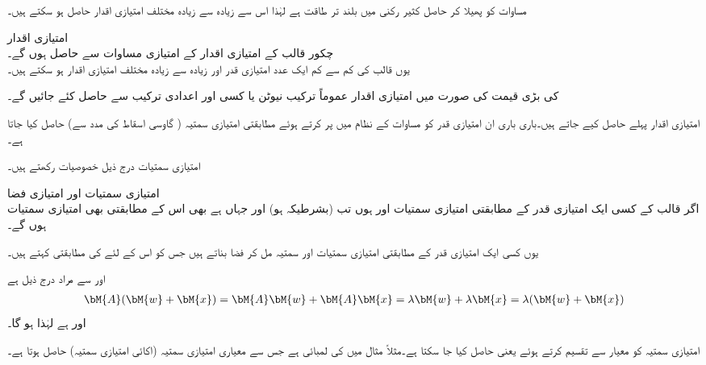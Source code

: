 مساوات  کو پھیلا کر حاصل کثیر رکنی میں  بلند تر طاقت ہے لہٰذا اس سے زیادہ سے زیادہ  مختلف امتیازی اقدار حاصل ہو سکتے ہیں۔ 

\quad امتیازی اقدار\\
چکور قالب  کے امتیازی اقدار  کے امتیازی مساوات  سے حاصل ہوں گے۔\\
یوں  قالب کی کم سے کم ایک عدد امتیازی قدر اور زیادہ سے زیادہ  مختلف  امتیازی اقدار ہو سکتے ہیں۔

 کی بڑی قیمت کی صورت میں امتیازی اقدار عموماً ترکیب نیوٹن یا کسی اور اعدادی ترکیب سے حاصل کئے جائیں گے۔

امتیازی اقدار پہلے حاصل کیے جاتے ہیں۔باری باری ان امتیازی قدر کو مساوات  کے نظام میں پر کرتے ہوئے مطابقتی امتیازی سمتیہ ( گاوسی اسقاط کی مدد سے) حاصل کیا جاتا ہے۔

امتیازی سمتیات درج ذیل خصوصیات رکھتے ہیں۔

\quad امتیازی سمتیات اور امتیازی فضا\\
اگر قالب  کے کسی ایک امتیازی قدر  کے مطابقتی امتیازی سمتیات  اور  ہوں تب  (بشرطیکہ  ہو) اور  جہاں  ہے بھی اس  کے مطابقتی بھی امتیازی سمتیات ہوں گے۔

یوں کسی ایک امتیازی قدر کے مطابقتی امتیازی سمتیات اور  سمتیہ مل کر فضا بناتے ہیں جس کو اس  کے لئے  کی مطابقتی   کہتے ہیں۔

 اور  سے مراد درج ذیل ہے
\begin{align*}
\bM{A}(\bM{w}+\bM{x})=\bM{A}\bM{w}+\bM{A}\bM{x}=\lambda \bM{w}+\lambda\bM{x}=\lambda(\bM{w}+\bM{x})
\end{align*}
اور  ہے لہٰذا  ہو گا۔

امتیازی سمتیہ کو معیار سے تقسیم کرتے ہوئے   یعنی  حاصل کیا جا سکتا ہے۔مثلاً مثال  میں  کی لمبائی  ہے جس سے معیاری امتیازی سمتیہ (اکائی امتیازی سمتیہ)  حاصل ہوتا ہے۔ 

